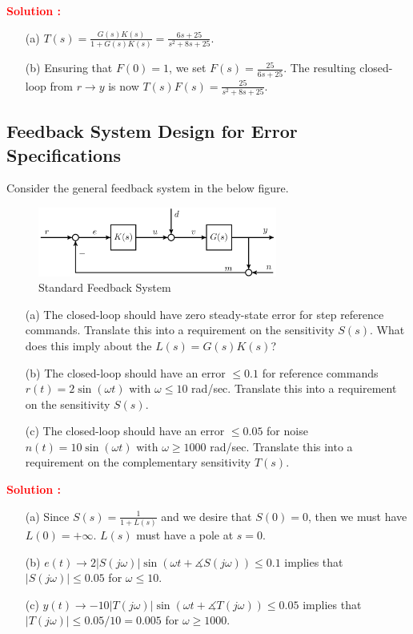 \documentclass[12pt]{article}
\begin{document}
\textbf{\textcolor{red}{Solution :}}

\begin{itemize}
    \item[(a)] $T(s) = \frac{G(s)K(s)}{1+G(s)K(s)} = \frac{6s + 25}{s^2 + 8s + 25}$.
    \item[(b)] Ensuring that $F(0) = 1$, we set $F(s) = \frac{25}{6s+25}$. The resulting closed-loop from $r\rightarrow y$ is now $T(s)F(s) = \frac{25}{s^2+8s+25}$.
\end{itemize}

\clearpage
\subsection{Feedback System Design for Error Specifications}

Consider the general feedback system in the below figure.
\begin{figure}[h]
    \centering
    \includegraphics[width=0.7\textwidth]{figs/4.2.png}
    \caption{Standard Feedback System}
    \label{fig:loop_97}
\end{figure}

\begin{itemize}
    \item[(a)] The closed-loop should have zero steady-state error for step reference commands. Translate this into a requirement on the sensitivity $S(s)$. What does this imply about the $L(s)=G(s)K(s)$?
    \item[(b)] The closed-loop should have an error $\leq 0.1$ for reference commands $r(t) = 2\sin(\omega t)$ with $\omega \leq 10$ rad/sec. Translate this into a requirement on the sensitivity $S(s)$.
    \item[(c)] The closed-loop should have an error $\leq 0.05$ for noise $n(t)=10\sin(\omega t)$ with $\omega \geq 1000$ rad/sec. Translate this into a requirement on the complementary sensitivity $T(s)$. 
\end{itemize}

\textbf{\textcolor{red}{Solution :}}

\begin{itemize}
    \item[(a)] Since $S(s) = \frac{1}{1+L(s)}$ and we desire that $S(0)=0$, then we must have $L(0) = +\infty$. $L(s)$ must have a pole at $s=0$.
    \item[(b)] $e(t) \rightarrow 2 |S(j \omega)| \sin(\omega t + \measuredangle S(j \omega)) \leq 0.1$ implies that $|S(j \omega)| \leq 0.05$ for $\omega \leq 10$.
    \item[(c)] $y(t) \rightarrow - 10 |T(j \omega)| \sin(\omega t + \measuredangle T(j\omega)) \leq 0.05$ implies that $|T(j \omega)| \leq 0.05/10 = 0.005$ for $\omega \geq 1000$.
\end{itemize}
\end{document}
